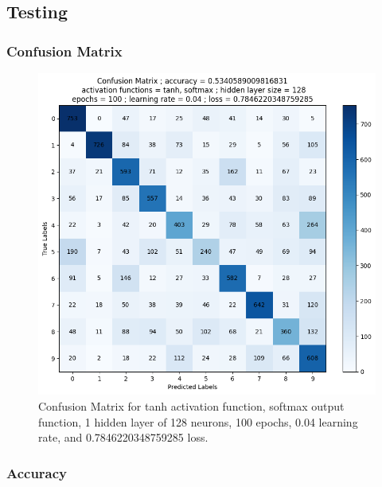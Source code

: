 \documentclass{article}
\begin{document}
\subsection{Testing}
\subsubsection{Confusion Matrix}
\begin{figure}
    \centering
    \includegraphics[width=\textwidth]{media/confusion/confusion_matrix_activation_functions_tanh_softmax_hidden_layer_size_128_epochs_100_learning_rate_0.04_loss_0.7846220348759285.png}
    \caption{Confusion Matrix for tanh activation function, softmax output function, 1 hidden layer of 128 neurons, 100 epochs, 0.04 learning rate, and 0.7846220348759285 loss.}
    \label{fig:confusion}
\end{figure}
\subsubsection{Accuracy}
\end{document}
